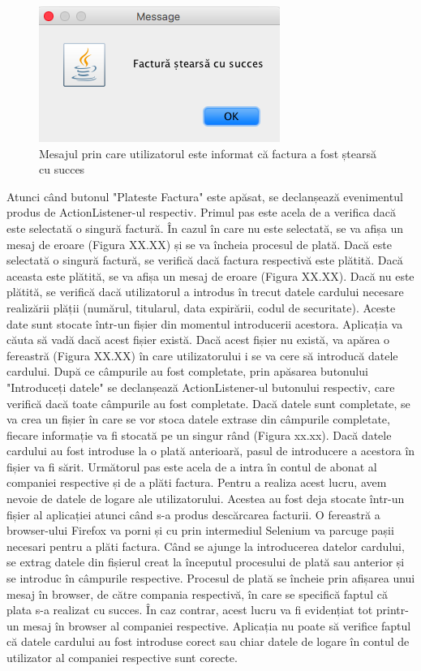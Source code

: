 \documentclass[12pt]{book}
\begin{document}
\begin{figure}[!ht]
	\centering
	\includegraphics{FacturaStearsaSucces}
	\caption{Mesajul prin care utilizatorul este informat că factura a fost ștearsă cu succes}
\end{figure}

Atunci când butonul "Plateste Factura" este apăsat, se declanșează evenimentul produs de ActionListener-ul respectiv. Primul pas este acela de a verifica dacă este selectată o singură factură. În cazul în care nu este selectată, se va afișa un mesaj de eroare (Figura XX.XX) și se va încheia procesul de plată. Dacă este selectată o singură factură, se verifică dacă factura respectivă este plătită. Dacă aceasta este plătită, se va afișa un mesaj de eroare (Figura XX.XX). Dacă nu este plătită, se verifică dacă utilizatorul a introdus în trecut datele cardului necesare realizării plății (numărul, titularul, data expirării, codul de securitate). Aceste date sunt stocate într-un fișier din momentul introducerii acestora. Aplicația va căuta să vadă dacă acest fișier există. Dacă acest fișier nu există, va apărea o fereastră (Figura XX.XX) în care utilizatorului i se va cere să introducă datele cardului. După ce câmpurile au fost completate, prin apăsarea butonului "Introduceți datele" se declanșează ActionListener-ul butonului respectiv, care verifică dacă toate câmpurile au fost completate. Dacă datele sunt completate, se va crea un fișier în care se vor stoca datele extrase din câmpurile completate, fiecare informație va fi stocată pe un singur rând (Figura xx.xx). Dacă datele cardului au fost introduse la o plată anterioară, pasul de introducere a acestora în fișier va fi sărit. Următorul pas este acela de a intra în contul de abonat al companiei respective și de a plăti factura. Pentru a realiza acest lucru, avem nevoie de datele de logare ale utilizatorului. Acestea au fost deja stocate într-un fișier al aplicației atunci când s-a produs descărcarea facturii. O fereastră a browser-ului Firefox va porni și cu prin intermediul Selenium va parcuge pașii necesari pentru a plăti factura. Când se ajunge la introducerea datelor cardului, se extrag datele din fișierul creat la începutul procesului de plată sau anterior și se introduc în câmpurile respective. Procesul de plată se încheie prin afișarea unui mesaj în browser, de către compania respectivă, în care se specifică faptul că plata s-a realizat cu succes. În caz contrar, acest lucru va fi evidențiat tot printr-un mesaj în browser al companiei respective. Aplicația nu poate să verifice faptul că datele cardului au fost introduse corect sau chiar datele de logare în contul de utilizator al companiei respective sunt corecte. 
\end{document}
